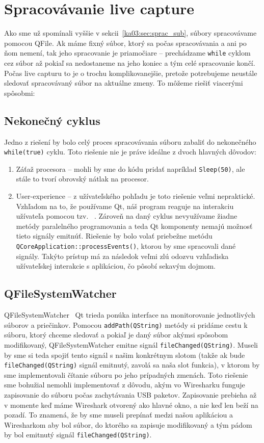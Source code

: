 \section{Spracovávanie live capture}
Ako sme už spomínali vyššie v sekcii~\ref{ka03:sec:sprac_sub}, súbory spracovávame pomocou QFile. Ak máme fixný súbor, ktorý sa počas spracovávania a ani po ňom nemení, tak jeho spracovanie je priamočiare -- prechádzame \texttt{while} cyklom cez súbor až pokiaľ sa nedostaneme na jeho koniec a tým celé spracovanie končí. Počas live capturu to je o trochu komplikovanejšie, pretože potrebujeme neustále sledovať spracovávaný súbor na aktuálne zmeny. To môžeme riešiť viacerými spôsobmi:

\subsection*{Nekonečný cyklus}
Jedno z riešení by bolo celý proces spracovávania súboru zabaliť do nekonečného \texttt{while(true)} cyklu. Toto riešenie nie je práve ideálne z dvoch hlavných dôvodov:
\begin{enumerate}
\item Záťaž procesora -- mohli by sme do kódu pridať napríklad \texttt{Sleep(50)}, ale stále to tvorí obrovský nátlak na procesor.
\item User-experience -- z užívateľského pohľadu je toto riešenie veľmi nepraktické. Vzhľadom na to, že používame Qt, náš program reaguje na interakciu užívateľa pomocou tzv. ~\cite{signal_slot}. Zároveň na daný cyklus nevyužívame žiadne metódy paralelného programovania a teda Qt komponenty nemajú možnosť tieto signály emitnúť. Riešenie by bolo volať priebežne metódu \texttt{QCoreApplication::processEvents()}, ktorou by sme spracovali dané signály. Takýto prístup má za následok veľmi zlú odozvu vzhľadiska užívateľskej interakcie s aplikáciou, čo pôsobí sekavým dojmom.
\end{enumerate}

\subsection*{QFileSystemWatcher}
QFileSystemWatcher~\cite{qfilesystemwatcher} Qt trieda ponúka interface na monitorovanie jednotlivých súborov a priečinkov. Pomocou \texttt{addPath(QString)} metódy si pridáme cestu k súboru, ktorý chceme sledovať a pokiaľ je daný súbor akýmsi spôsobom modifikovaný, QFileSystemWatcher emitne signál \texttt{fileChanged(QString)}. Museli by sme si teda spojiť tento signál s našim konkrétnym slotom (takže ak bude \texttt{fileChanged(QString)} signál emitnutý, zavolá sa naša slot funkcia), v ktorom by sme implementovali čítanie súboru po jeho prípadných zmenách. Toto riešenie sme bohužial nemohli implementovať z dôvodu, akým vo Wiresharku funguje zapisovanie do súboru počas zachytávania USB paketov. Zapisovanie prebieha až v momente keď máme Wireshark otvorený ako hlavné okno, a nie keď len beží na pozadí. To znamená, že by sme museli prepínať medzi našou aplikáciou a Wiresharkom aby bol súbor, do ktorého sa zapisuje modifikovaný a tým pádom by bol emitnutý signál \texttt{fileChanged(QString)}.


